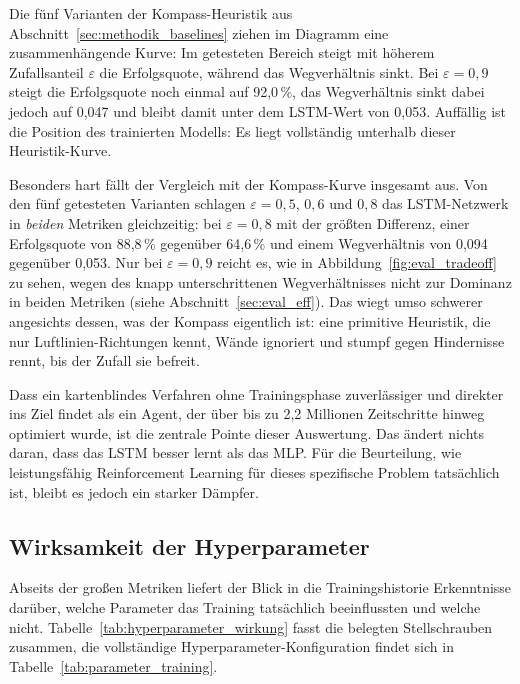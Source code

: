 \documentclass[
  a4paper,
  11pt,
  twoside,
  BCOR=8mm,           %
  headings=big,
  numbers=noenddot,
  listof=totoc,       %
  captions=tableheading,
]{scrreprt}
\begin{document}
Die fünf Varianten der Kompass-Heuristik aus Abschnitt~\ref{sec:methodik_baselines} ziehen im Diagramm eine zusammenhängende Kurve: Im getesteten Bereich steigt mit höherem Zufallsanteil $\varepsilon$ die Erfolgsquote, während das Wegverhältnis sinkt. Bei $\varepsilon=0{,}9$ steigt die Erfolgsquote noch einmal auf 92,0\,\%, das Wegverhältnis sinkt dabei jedoch auf 0,047 und bleibt damit unter dem LSTM-Wert von 0,053. Auffällig ist die Position des trainierten Modells: Es liegt vollständig unterhalb dieser Heuristik-Kurve.

Besonders hart fällt der Vergleich mit der Kompass-Kurve insgesamt aus. Von den fünf getesteten Varianten schlagen $\varepsilon=0{,}5$, $0{,}6$ und $0{,}8$ das LSTM-Netzwerk in \emph{beiden} Metriken gleichzeitig: bei $\varepsilon=0{,}8$ mit der größten Differenz, einer Erfolgsquote von 88,8\,\% gegenüber 64,6\,\% und einem Wegverhältnis von 0,094 gegenüber 0,053. Nur bei $\varepsilon=0{,}9$ reicht es, wie in Abbildung~\ref{fig:eval_tradeoff} zu sehen, wegen des knapp unterschrittenen Wegverhältnisses nicht zur Dominanz in beiden Metriken (siehe Abschnitt~\ref{sec:eval_eff}). Das wiegt umso schwerer angesichts dessen, was der Kompass eigentlich ist: eine primitive Heuristik, die nur Luftlinien-Richtungen kennt, Wände ignoriert und stumpf gegen Hindernisse rennt, bis der Zufall sie befreit.

Dass ein kartenblindes Verfahren ohne Trainingsphase zuverlässiger und direkter ins Ziel findet als ein Agent, der über bis zu 2,2 Millionen Zeitschritte hinweg optimiert wurde, ist die zentrale Pointe dieser Auswertung. Das ändert nichts daran, dass das LSTM besser lernt als das MLP. Für die Beurteilung, wie leistungsfähig Reinforcement Learning für dieses spezifische Problem tatsächlich ist, bleibt es jedoch ein starker Dämpfer.

\subsection{Wirksamkeit der Hyperparameter}
\label{sec:eval_hyperparameter}
Abseits der großen Metriken liefert der Blick in die Trainingshistorie Erkenntnisse darüber, welche Parameter das Training tatsächlich beeinflussten und welche nicht. Tabelle~\ref{tab:hyperparameter_wirkung} fasst die belegten Stellschrauben zusammen, die vollständige Hyperparameter-Konfiguration findet sich in Tabelle~\ref{tab:parameter_training}.
\end{document}
